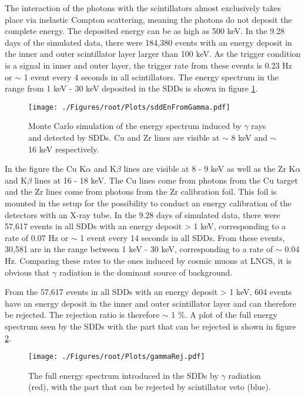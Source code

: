 The interaction of the photons with the scintillators almost exclusively takes place via inelastic Compton scattering, meaning the photons do not deposit the complete energy. The deposited energy can be as high as 500 keV. In the 9.28 days of the simulated data, there were 184,380 events with an energy deposit in the inner and outer scintillator layer larger than 100 keV. As the trigger condition is a signal in inner and outer layer, the trigger rate from these events is 0.23 Hz or $\sim$ 1 event every 4 seconds in all scintillators. The energy spectrum in the range from 1 keV - 30 keV deposited in the SDDs is shown in figure \ref{fig:sddEnDepGamma}.
\begin{figure}[h]
 \centering
 \texttt{[image: ./Figures/root/Plots/sddEnFromGamma.pdf]}
 \caption{Monte Carlo simulation of the energy spectrum induced by $\gamma$ rays and detected by SDDs. Cu and Zr lines are visible at $\sim$ 8 keV and $\sim$ 16 keV respectively.}
 \label{fig:sddEnDepGamma}
\end{figure}
In the figure the Cu K$\alpha$ and K$\beta$ lines are visible at 8 - 9 keV as well as the Zr K$\alpha$ and K$\beta$ lines at 16 - 18 keV. The Cu lines come from photons from the Cu target and the Zr lines come from photons from the Zr calibration foil. This foil is mounted in the setup for the possibility to conduct an energy calibration of the detectors with an X-ray tube. In the 9.28 days of simulated data, there were 57,617 events in all SDDs with an energy deposit > 1 keV, corresponding to a rate of 0.07 Hz or $\sim$ 1 event every 14 seconds in all SDDs. From these events, 30,581 are in the range between 1 keV - 30 keV, corresponding to a rate of $\sim$ 0.04 Hz. Comparing these rates to the ones induced by cosmic muons at LNGS, it is obvious that $\gamma$ radiation is the dominant source of background.

From the 57,617 events in all SDDs with an energy deposit > 1 keV, 604 events have an energy deposit in the inner and outer scintillator layer and can therefore be rejected. The rejection ratio is therefore $\sim$ 1 \%. A plot of the full energy spectrum seen by the SDDs with the part that can be rejected is shown in figure \ref{fig:gammaRej}.
\begin{figure}[h]
 \centering
 \texttt{[image: ./Figures/root/Plots/gammaRej.pdf]}
 \caption{The full energy spectrum introduced in the SDDs by $\gamma$ radiation (red), with the part that can be rejected by scintillator veto (blue).}
 \label{fig:gammaRej}
\end{figure}





